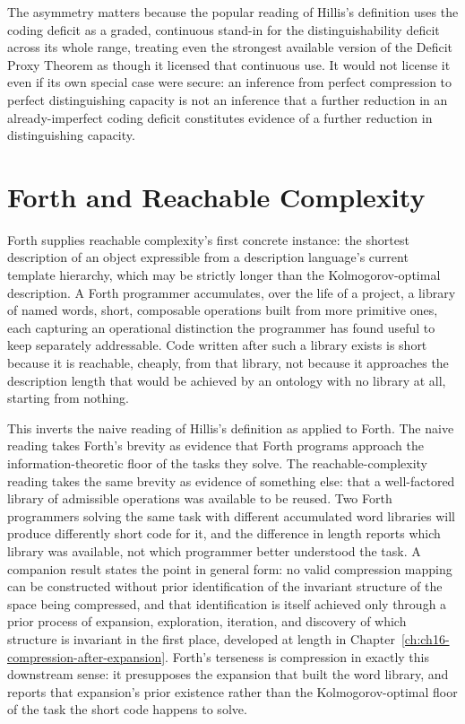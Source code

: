 The asymmetry matters because the popular reading of Hillis's definition uses the coding deficit as a graded, continuous stand-in for the distinguishability deficit across its whole range, treating even the strongest available version of the Deficit Proxy Theorem as though it licensed that continuous use. It would not license it even if its own special case were secure: an inference from perfect compression to perfect distinguishing capacity is not an inference that a further reduction in an already-imperfect coding deficit constitutes evidence of a further reduction in distinguishing capacity.

\section{Forth and Reachable Complexity}

Forth supplies reachable complexity's first concrete instance: the shortest description of an object expressible from a description language's current template hierarchy, which may be strictly longer than the Kolmogorov-optimal description. A Forth programmer accumulates, over the life of a project, a library of named words, short, composable operations built from more primitive ones, each capturing an operational distinction the programmer has found useful to keep separately addressable. Code written after such a library exists is short because it is reachable, cheaply, from that library, not because it approaches the description length that would be achieved by an ontology with no library at all, starting from nothing.

This inverts the naive reading of Hillis's definition as applied to Forth. The naive reading takes Forth's brevity as evidence that Forth programs approach the information-theoretic floor of the tasks they solve. The reachable-complexity reading takes the same brevity as evidence of something else: that a well-factored library of admissible operations was available to be reused. Two Forth programmers solving the same task with different accumulated word libraries will produce differently short code for it, and the difference in length reports which library was available, not which programmer better understood the task. A companion result states the point in general form: no valid compression mapping can be constructed without prior identification of the invariant structure of the space being compressed, and that identification is itself achieved only through a prior process of expansion, exploration, iteration, and discovery of which structure is invariant in the first place, developed at length in Chapter~\ref{ch:ch16-compression-after-expansion}. Forth's terseness is compression in exactly this downstream sense: it presupposes the expansion that built the word library, and reports that expansion's prior existence rather than the Kolmogorov-optimal floor of the task the short code happens to solve.

